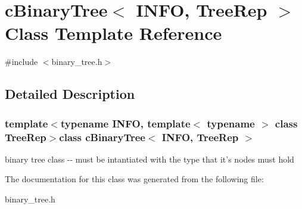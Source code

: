 \hypertarget{classcBinaryTree}{\section{c\-Binary\-Tree$<$ \-I\-N\-F\-O, \-Tree\-Rep $>$ \-Class \-Template \-Reference}
\label{classcBinaryTree}
}


{\ttfamily \#include $<$binary\-\_\-tree.\-h$>$}



\subsection{\-Detailed \-Description}
\subsubsection*{template$<$typename I\-N\-F\-O, template$<$ typename $>$ class \-Tree\-Rep$>$class c\-Binary\-Tree$<$ I\-N\-F\-O, Tree\-Rep $>$}

binary tree class -\/-\/ must be intantiated with the type that it's nodes must hold 

\-The documentation for this class was generated from the following file\-:\begin{DoxyCompactItemize}
\item 
binary\-\_\-tree.\-h\end{DoxyCompactItemize}
